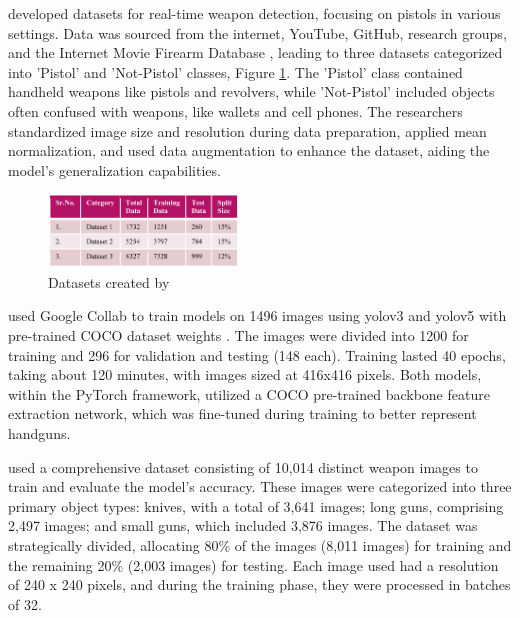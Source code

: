 \citet{rfc4} developed datasets for real-time weapon detection, focusing on pistols in various settings. Data was sourced from the internet, YouTube, GitHub, research groups, and the Internet Movie Firearm Database \cite{rfc28}, leading to three datasets categorized into 'Pistol' and 'Not-Pistol' classes, Figure \ref{fig:bathi-dataset}. The 'Pistol' class contained handheld weapons like pistols and revolvers, while 'Not-Pistol' included objects often confused with weapons, like wallets and cell phones. The researchers standardized image size and resolution during data preparation, applied mean normalization, and used data augmentation to enhance the dataset, aiding the model's generalization capabilities.
\begin{figure}[h]
    \centering 
    \includegraphics[width=0.45\textwidth]{figs/bathi-dataset.png} 
    \caption{Datasets created by~\cite{rfc4}}
    \label{fig:bathi-dataset}
\end{figure}

\citet{rfc5} used Google Collab \cite{rfc26} to train models on 1496 images using \ac{yolo}v3 and \ac{yolo}v5 with pre-trained COCO dataset weights \cite{rfc16}. The images were divided into 1200 for training and 296 for validation and testing (148 each). Training lasted 40 epochs, taking about 120 minutes, with images sized at 416x416 pixels. Both models, within the PyTorch framework, utilized a COCO pre-trained backbone feature extraction network, which was fine-tuned during training to better represent handguns.

\citet{rfc6} used a comprehensive dataset consisting of 10,014 distinct weapon images to train and evaluate the model's accuracy. These images were categorized into three primary object types: knives, with a total of 3,641 images; long guns, comprising 2,497 images; and small guns, which included 3,876 images. The dataset was strategically divided, allocating 80\% of the images (8,011 images) for training and the remaining 20\% (2,003 images) for testing. Each image used had a resolution of 240 x 240 pixels, and during the training phase, they were processed in batches of 32.

